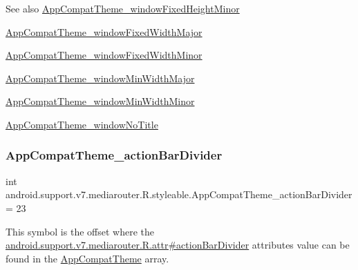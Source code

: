 \begin{DoxySeeAlso}{See also}
\hyperlink{classandroid_1_1support_1_1v7_1_1mediarouter_1_1R_1_1styleable_a9d793fbf38eeb7d1b8c2707b951dcf24}{App\+Compat\+Theme\+\_\+window\+Fixed\+Height\+Minor} 

\hyperlink{classandroid_1_1support_1_1v7_1_1mediarouter_1_1R_1_1styleable_a2a286949ebf9182579df1a88e8e294d0}{App\+Compat\+Theme\+\_\+window\+Fixed\+Width\+Major} 

\hyperlink{classandroid_1_1support_1_1v7_1_1mediarouter_1_1R_1_1styleable_a291edfbcc421e452ee7b5b1b806fdd68}{App\+Compat\+Theme\+\_\+window\+Fixed\+Width\+Minor} 

\hyperlink{classandroid_1_1support_1_1v7_1_1mediarouter_1_1R_1_1styleable_ac2a09f6509c071955e5978f37e5c4633}{App\+Compat\+Theme\+\_\+window\+Min\+Width\+Major} 

\hyperlink{classandroid_1_1support_1_1v7_1_1mediarouter_1_1R_1_1styleable_aa71bde585a9d55a3de254d2ece1c876d}{App\+Compat\+Theme\+\_\+window\+Min\+Width\+Minor} 

\hyperlink{classandroid_1_1support_1_1v7_1_1mediarouter_1_1R_1_1styleable_a26662431b0c47b968955d940dc4adc24}{App\+Compat\+Theme\+\_\+window\+No\+Title} 
\end{DoxySeeAlso}
\mbox{\label{classandroid_1_1support_1_1v7_1_1mediarouter_1_1R_1_1styleable_a6ca0030f0c9be330422f3f56c9118802}} 
\subsubsection{\texorpdfstring{App\+Compat\+Theme\+\_\+action\+Bar\+Divider}{AppCompatTheme\_actionBarDivider}}
{\footnotesize\ttfamily int android.\+support.\+v7.\+mediarouter.\+R.\+styleable.\+App\+Compat\+Theme\+\_\+action\+Bar\+Divider = 23\hspace{0.3cm}{\ttfamily [static]}}

This symbol is the offset where the \hyperlink{classandroid_1_1support_1_1v7_1_1mediarouter_1_1R_1_1attr_a5f28c6cba7400ef345df849042e135b7}{android.\+support.\+v7.\+mediarouter.\+R.\+attr\#action\+Bar\+Divider} attribute\textquotesingle{}s value can be found in the \hyperlink{classandroid_1_1support_1_1v7_1_1mediarouter_1_1R_1_1styleable_a4e3d3900c75d49aeb2f283cac00214d6}{App\+Compat\+Theme} array.

